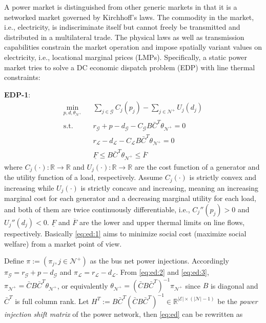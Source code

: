 \documentclass[journal,12pt,onecolumn,draftclsnofoot]{IEEEtran}
\begin{document}
A power market is distinguished from other generic markets in that it is a networked market governed by Kirchhoff's laws. The commodity in the market, i.e., electricity, is indiscriminate itself but cannot freely be transmitted and distributed in a multilateral trade. The physical laws as well as transmission capabilities constrain the market operation and impose spatially variant values on electricity, i.e., locational marginal prices (LMPs). Specifically, a static power market tries to solve a DC economic dispatch problem (EDP) with line thermal constraints:

\noindent
\textbf{EDP-1}:
\begin{subequations}
	\begin{eqnarray}
	\label{eq:ed:1}
	 \min_{p,d, \theta_{\mathcal{N}^+}} &&   \sum_{j\in\mathcal{G}} C_j(p_j) - \sum_{j\in\mathcal{N}^+} U_j(d_j)   \\
	 	\label{eq:ed:2}
	 \mathrm{s.t.} &&   r_\mathcal{G} +p  - d_\mathcal{G}    - C_{\mathcal{G}}  B\bar C^T \theta_{\mathcal{N}^+} =0\\
	 	\label{eq:ed:3}
	 &&  r_{\mathcal{L}} - d_{\mathcal{L}}  - C_{\mathcal{L}}  B\bar C^T \theta_{\mathcal{N}^+}= 0  \\
	 	\label{eq:ed:4}
	 &&   \underline{F} \le  B\bar C^T \theta_{\mathcal{N}^+}  \le  \overline{F} 
	\end{eqnarray}	\label{eq:ed}%
\end{subequations}
where $C_j(\cdot): \mathbb{R} \rightarrow \mathbb{R}$ and $U_j(\cdot): \mathbb{R} \rightarrow \mathbb{R}$ are the cost function of a generator and the utility function of a load, respectively. Assume $C_j(\cdot)$ is strictly convex and increasing while $U_j(\cdot)$ is strictly concave and increasing, meaning an increasing marginal cost for each generator and a decreasing marginal utility for each load, and both of them are twice continuously differentiable, i.e., $C_j''(p_j)>0$ and $U_j''(d_j)<0$. $\underline{F}$ and $\overline{F}$ are the lower and upper thermal limits on line flows, respectively. Basically \eqref{eq:ed:1} aims to minimize social cost (maximize social welfare) from a market point of view. 

Define $\pi:=(\pi_j,j\in\mathcal{N}^+)$ as the bus net power injections. Accordingly $\pi_{\mathcal{G}}=r_\mathcal{G}+p-d_\mathcal{G}$ and $\pi_{\mathcal{L}}=r_\mathcal{L}-d_\mathcal{L}$. From \eqref{eq:ed:2} and \eqref{eq:ed:3}, $\pi_{\mathcal{N}^+}=\bar CB\bar{C}^T\theta_{\mathcal{N}^+}$, or equivalently $\theta_{\mathcal{N}^+}=(\bar CB\bar{C}^T)^{-1}\pi_{\mathcal{N}^+}$ since $B$ is diagonal and $\bar C^T$ is full column rank. Let $H^T:=B\bar C^T (\bar CB\bar{C}^T)^{-1}\in\mathbb{R}^{|\mathcal{E}|\times(|\mathcal{N}|-1)}$ be the \emph{power injection shift matrix} of the power network, then \eqref{eq:ed} can be rewritten as  
\end{document}
